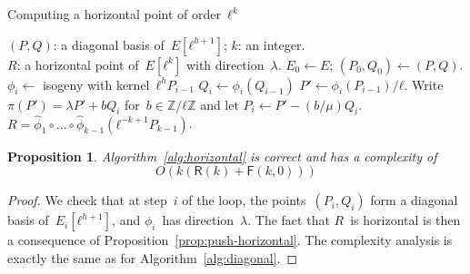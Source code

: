 \documentclass{lms}
\newtheorem{prop}[thm]{Proposition}
\def\pa#1{\left(#1\right)}
\def\cout#1{\mathsf{#1}}
\begin{document}
\begin{algorithm}
\caption{\label{alg:horizontal}Computing a horizontal point of order~$ℓ^k$}
\begin{algorithmic}[1]
\REQUIRE $(P, Q)$: a diagonal basis of~$E[ℓ^{h+1}]$; $k$: an integer.\\
\ENSURE $R$: a horizontal point of~$E[ℓ^k]$ with direction~$λ$.
\STATE $E_0 \gets E$; $(P_0, Q_0) \gets (P, Q)$.
\STATE $ϕ_i \gets $ isogeny with kernel~$ℓ^{h} P_{i-1}$
\STATE $Q_{i} \gets ϕ_i(Q_{i-1})$
\STATE $P' \gets ϕ_i(P_{i-1})/ℓ$.
\STATE Write~$π(P') = λ P' + b Q_i$ for~$b ∈ ℤ/ℓℤ$ and
let $P_{i} \gets P' - (b/μ) Q_i$.
\ENDFOR
\RETURN $R = \widehat{ϕ}_1 ∘ … ∘ \widehat{ϕ}_{k-1} ( ℓ^{-k+1} P_{k-1} )$.
\end{algorithmic}
\end{algorithm}
\begin{prop}
Algorithm~\ref{alg:horizontal} is correct and has a complexity of
\begin{equation*}
O(k(\mathsf{R}(k)+\mathsf{F}(k,0)))
\end{equation*}
\end{prop}
\begin{proof}
We check that at step~$i$ of the loop,
the points~$(P_i, Q_i)$ form a diagonal basis of~$E_i[ℓ^{h+1}]$,
and $ϕ_i$~has direction~$λ$.
The fact that $R$~is horizontal is then a consequence
of Proposition~\ref{prop:push-horizontal}.
The complexity analysis %
is exactly the same as for Algorithm~\ref{alg:diagonal}.
\end{proof}
\end{document}
